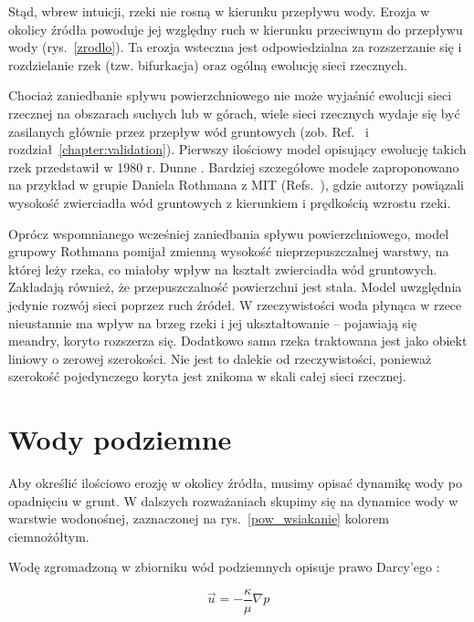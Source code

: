 \documentclass[]{pracamgr}
\begin{document}
    Stąd, wbrew intuicji, rzeki nie rosną w kierunku przepływu wody. Erozja w okolicy źródła powoduje jej względny ruch w kierunku przeciwnym do przepływu wody (rys.~\ref{zrodlo}). Ta erozja wsteczna jest odpowiedzialna za rozszerzanie się i rozdzielanie rzek (tzw. bifurkacja) oraz ogólną ewolucję sieci rzecznych.

    Chociaż zaniedbanie spływu powierzchniowego nie może wyjaśnić ewolucji sieci rzecznej na obszarach suchych lub w górach, wiele sieci rzecznych wydaje się być zasilanych głównie przez przepływ wód gruntowych (zob. Ref.~\cite{schumm1995ground, petroff2011geometry, seybold2017climate} i rozdział~\ref{chapter:validation}). Pierwszy ilościowy model opisujący ewolucję takich rzek przedstawił w 1980 r. Dunne \cite{dunne1980formation}. Bardziej szczegółowe modele zaproponowano na przykład w grupie Daniela Rothmana z MIT (Refs.~\cite{petroff2012four, devauchelle2012ramification}), gdzie autorzy powiązali wysokość zwierciadła wód gruntowych z kierunkiem i prędkością wzrostu rzeki.

    Oprócz wspomnianego wcześniej zaniedbania spływu powierzchniowego, model grupowy Rothmana pomijał zmienną wysokość nieprzepuszczalnej warstwy, na której leży rzeka, co miałoby wpływ na kształt zwierciadła wód gruntowych. Zakładają również, że przepuszczalność powierzchni jest stała. Model uwzględnia jedynie rozwój sieci poprzez ruch źródeł. W rzeczywistości woda płynąca w rzece nieustannie ma wpływ na brzeg rzeki i jej ukształtowanie -- pojawiają się meandry, koryto rozszerza się. Dodatkowo sama rzeka traktowana jest jako obiekt liniowy o zerowej szerokości. Nie jest to dalekie od rzeczywistości, ponieważ szerokość pojedynczego koryta jest znikoma w skali całej sieci rzecznej.

    \section{Wody podziemne}

      Aby określić ilościowo erozję w okolicy źródła, musimy opisać dynamikę wody po opadnięciu w grunt. W dalszych rozważaniach skupimy się na dynamice wody w warstwie wodonośnej, zaznaczonej na rys.~\ref{pow_wsiakanie} kolorem ciemnożółtym.

      Wodę zgromadzoną w zbiorniku wód podziemnych opisuje prawo Darcy'ego \cite{darcy1856fontaines}:
      
      \begin{equation}
        \vec{u}=-\frac{\kappa}{\mu} \nabla p
      \end{equation}	
      
\end{document}
